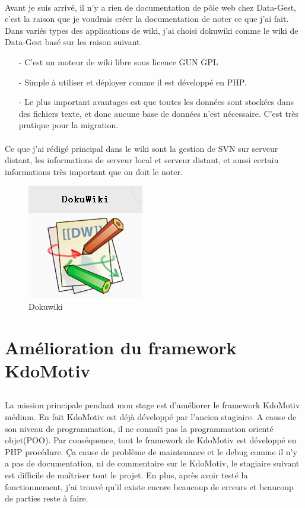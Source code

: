 \paragraph{}
Avant je suis arrivé, il n'y a rien de documentation de pôle web chez Data-Gest, c'est la raison que je voudrais créer la documentation de noter ce que j'ai fait. Dans variés types des applications de wiki, j'ai choisi dokuwiki comme le wiki de Data-Gest basé sur les raison suivant.
\begin{itemize}
\item [-] C'est un moteur de wiki libre sous licence GUN GPL
\item [-] Simple à utiliser et déployer comme il est développé en PHP.
\item [-] Le plus important avantages est que toutes les données sont stockées dans des fichiers texte, et donc aucune base de données n’est nécessaire. C'est très pratique pour la migration.
\end{itemize}

\paragraph{}
Ce que j'ai rédigé principal dans le wiki sont la gestion de SVN sur serveur distant, les informations de serveur local et serveur distant, et aussi certain informations très important que on doit le noter. 

\begin{figure}[hbtp]
\center
\includegraphics[scale=1]{body/images/dukowiki.png}
\caption{Dokuwiki}
\end{figure}

\newpage

\section[Amélioration KdoMotiv]{Amélioration du framework KdoMotiv}
\subsection*{}
La mission principale pendant mon stage est d'améliorer le framework KdoMotiv médium. En fait KdoMotiv est déjà développé par l'ancien stagiaire. A cause de son niveau de programmation, il ne connaît pas la programmation orienté objet(POO). Par conséquence, tout le framework de KdoMotiv est développé en PHP procédure. Ça cause de problème de maintenance et le debug comme il n'y a pas de documentation, ni de commentaire sur le KdoMotiv, le stagiaire suivant est difficile de maîtriser tout le projet. En plus, après avoir testé la fonctionnement, j'ai trouvé qu'il existe encore beaucoup de erreurs et beaucoup de parties reste à faire.

